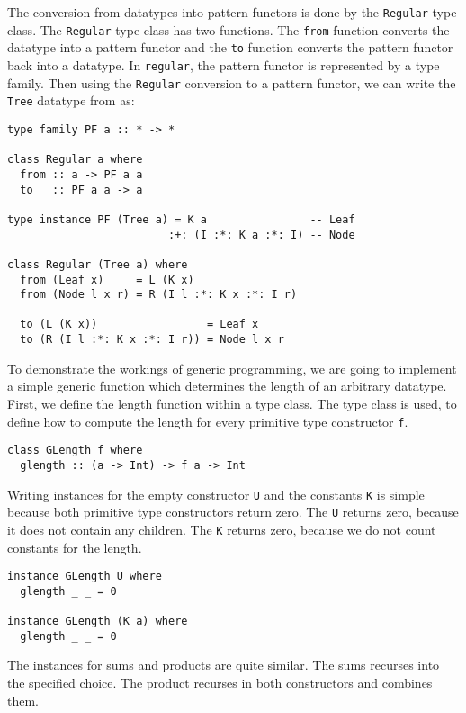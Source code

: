 The conversion from datatypes into pattern functors is done by the \texttt{Regular} type class. The \texttt{Regular} type class has two functions. The \texttt{from} function converts the datatype into a pattern functor and the \texttt{to} function converts the pattern functor back into a datatype. In \texttt{regular}, the pattern functor is represented by a type family. Then using the \texttt{Regular} conversion to a pattern functor, we can write the \texttt{Tree} datatype from  as:

\begin{verbatim}
type family PF a :: * -> *

class Regular a where
  from :: a -> PF a a
  to   :: PF a a -> a

type instance PF (Tree a) = K a                -- Leaf
                         :+: (I :*: K a :*: I) -- Node

class Regular (Tree a) where
  from (Leaf x)     = L (K x)
  from (Node l x r) = R (I l :*: K x :*: I r)                 

  to (L (K x))                 = Leaf x
  to (R (I l :*: K x :*: I r)) = Node l x r
\end{verbatim}

To demonstrate the workings of generic programming, we are going to implement a simple generic function which determines the length of an arbitrary datatype. First, we define the length function within a type class. The type class is used, to define how to compute the length for every primitive type constructor \texttt{f}. 

\begin{verbatim}
class GLength f where
  glength :: (a -> Int) -> f a -> Int
\end{verbatim}

Writing instances for the empty constructor \texttt{U} and the constants \texttt{K} is simple because both primitive type constructors return zero. The \texttt{U} returns zero, because it does not contain any children. The \texttt{K} returns zero, because we do not count constants for the length. 

\begin{verbatim}
instance GLength U where
  glength _ _ = 0

instance GLength (K a) where
  glength _ _ = 0
\end{verbatim}

The instances for sums and products are quite similar. The sums recurses into the specified choice. The product recurses in both constructors and combines them.

